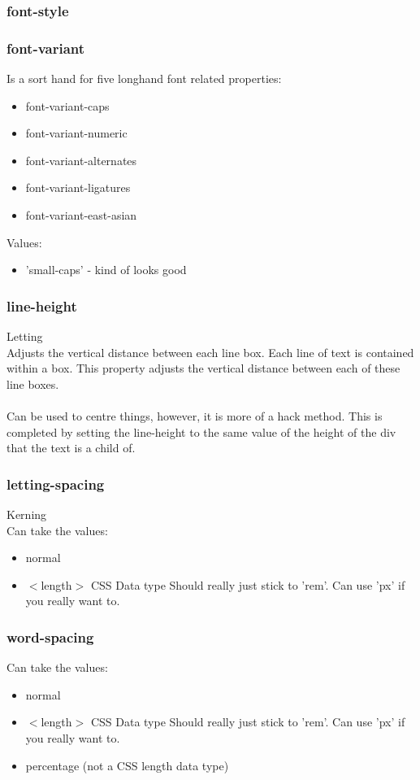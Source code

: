 \documentclass[]{article}
\newcommand{\<}{\guilsinglleft}
\renewcommand{\>}{\guilsinglright}
\begin{document}
\subsubsection{font-style}

\subsubsection{font-variant}
Is a sort hand for five longhand font related properties:
\begin{itemize}
	\item font-variant-caps
	\item font-variant-numeric
	\item font-variant-alternates
	\item font-variant-ligatures
	\item font-variant-east-asian
\end{itemize}
Values:
\begin{itemize}
	\item 'small-caps' - kind of looks good
\end{itemize}

\subsubsection{line-height}
Letting
\\
Adjusts the vertical distance between each line box.  Each line of text is contained within a box.  This property adjusts the vertical distance between each of these line boxes.
\\\\
Can be used to centre things, however, it is more of a hack method.  This is completed by setting the line-height to the same value of the height of the div that the text is a child of.

\subsubsection{letting-spacing}
Kerning
\\
Can take the values:
\begin{itemize}
	\item normal
	
	\item $<$length$>$  CSS Data type 
	\subitem Should really just stick to 'rem'.  Can use 'px' if you really want to.
\end{itemize}

\subsubsection{word-spacing}
Can take the values:
\begin{itemize}
	\item normal
	
	\item $<$length$>$  CSS Data type 
	\subitem Should really just stick to 'rem'.  Can use 'px' if you really want to.
	
	\item percentage (not a CSS length data type)
\end{itemize}
\end{document}
